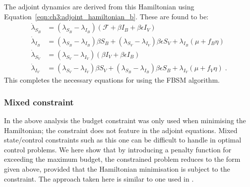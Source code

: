 The adjoint dynamics are derived from this Hamiltonian using Equation~\ref{eqn:ch3:adjoint_hamiltonian_b}. These are found to be:
\begin{subequations}\label{eqn:ch3:adjoint_dynamics}
    \begin{align}
    \dot{\lambda}_{S_B} &= \left(\lambda_{S_B} - \lambda_{I_B}\right)\left(\mathcal{F} + \beta{}I_B+\beta\epsilon{}I_V\right) \label{eqn:ch3:adjoint_dynamics_a} \\
    \dot{\lambda}_{I_B} &= \left(\lambda_{S_B} - \lambda_{I_B}\right)\beta{}S_B + \left(\lambda_{S_V} - \lambda_{I_V}\right)\beta\epsilon{}S_V + \lambda_{I_B}\left(\mu + f_B\eta\right) \label{eqn:ch3:adjoint_dynamics_b} \\
    \dot{\lambda}_{S_V} &= \left(\lambda_{S_V} - \lambda_{I_V}\right)\left(\beta{}I_V+\beta\epsilon{}I_B\right) \label{eqn:ch3:adjoint_dynamics_c} \\
    \dot{\lambda}_{I_V} &= \left(\lambda_{S_V} - \lambda_{I_V}\right)\beta{}S_V + \left(\lambda_{S_B} - \lambda_{I_B}\right)\beta\epsilon{}S_B + \lambda_{I_V}\left(\mu + f_V\eta\right)\;. \label{eqn:ch3:adjoint_dynamics_d}
    \end{align}
\end{subequations}
This completes the necessary equations for using the FBSM algorithm.

\subsubsection{Mixed constraint}

In the above analysis the budget constraint was only used when minimising the Hamiltonian; the constraint does not feature in the adjoint equations. Mixed state/control constraints such as this one can be difficult to handle in optimal control problems. We here show that by introducing a penalty function for exceeding the maximum budget, the constrained problem reduces to the form given above, provided that the Hamiltonian minimisation is subject to the constraint. The approach taken here is similar to one used in \citet[Chapter 4]{sage_optimum_1968}.

